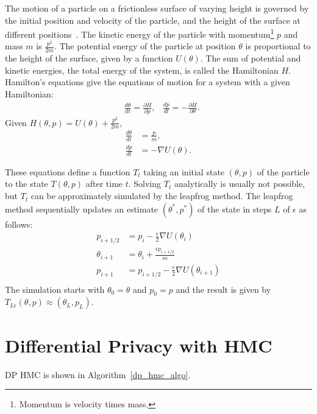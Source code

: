 \documentclass[english,twoside,openright]{HYgraduMLDS}
\begin{document}
The motion of a particle on a frictionless surface of varying height is governed 
by the initial position and velocity of the particle, and the height of the 
surface at different positions~\cite{neal2012mcmc}. 
The kinetic energy of the particle with 
momentum\footnote{Momentum is velocity times mass.}
\(p\) and mass \(m\) is \(\frac{p^2}{2m}\). The potential energy of the particle 
at position \(\theta\) is proportional to the height of the surface, given by 
a function \(U(\theta)\). The sum of potential and kinetic energies, the total 
energy of the system, is called the Hamiltonian \(H\). Hamilton's equations 
give the equations of motion for a system with a given Hamiltonian:
\begin{align*}
    &\frac{d\theta}{dt} = \frac{\partial H}{\partial p},
    &\frac{dp}{dt} = -\frac{\partial H}{\partial \theta}.
\end{align*}
Given \(H(\theta, p) = U(\theta) + \frac{p^2}{2m}\),
\begin{align*}
    \frac{d\theta}{dt} &= \frac{p}{m}, \\
    \frac{dp}{dt} &= -\nabla U(\theta).
\end{align*}

These equations define a function \(T_t\) taking an initial state 
\((\theta, p)\) of the particle to the state \(T(\theta, p)\) after time \(t\).
Solving \(T_t\) analytically is usually not possible, but \(T_t\) can be 
approximately simulated by the leapfrog method. The leapfrog method sequentially 
updates an estimate \((\theta^*, p^*)\) of the state in steps \(L\) of \(\epsilon\) 
as follows:
\begin{align*}
    p_{i+1/2} &= p_i - \frac{\epsilon}{2}\nabla U(\theta_i) \\
    \theta_{i+1} &= \theta_i + \frac{\epsilon p_{i+1/2}}{m} \\
    p_{i+1} &= p_{i+1/2} - \frac{\epsilon}{2}\nabla U(\theta_{i+1}) \\
\end{align*}
The simulation starts with \(\theta_0 = \theta\) and \(p_0 = p\) and the 
result is given by \(T_{L\epsilon}(\theta, p) \approx (\theta_L, p_L)\).

\section{Differential Privacy with HMC}\label{dp_hmc_section}
DP HMC is shown in Algorithm~\ref{dp_hmc_algo}.
\end{document}

